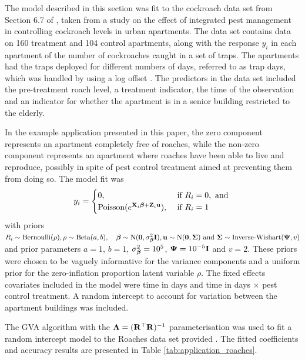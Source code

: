 The model described in this section was fit  to the cockroach data set from
Section 6.7 of \cite{Gelman2007}, taken from a study on the effect of
integrated pest management in controlling cockroach levels in urban apartments.
The data set contains data on 160 treatment and 104 control apartments, along
with the response $y_i$ in each apartment of the number of cockroaches caught
in a set of traps. The apartments had the traps deployed for different numbers
of days, referred to as trap days, which was handled by using a log offset
\citep{Agresti2002}. The predictors in the data set included the pre-treatment
roach level, a treatment indicator, the time of the observation and an
indicator for whether the apartment is in a senior building restricted to the
elderly.
		
In the example application presented in this paper, the zero component
represents an apartment completely free of roaches, while the non-zero
component represents an apartment where roaches have been able to live and
reproduce, possibly in spite of pest control treatment aimed at preventing them
from doing so. The model fit was
\begin{equation*}
    y_i = \begin{cases}
        0, &\text{ if } R_i = 0, \text{ and } \\
        \text{Poisson}(e^{{\bf X}_i {\boldsymbol \beta} + {\bf Z}_i {\bf u}}), & \text{ if } R_i = 1
	\end{cases}
\end{equation*}
with priors $R_i \sim \text{Bernoulli}(\rho), \rho \sim \text{Beta}(a, b),
\quad {\boldsymbol\beta} \sim \text{N}({\bf 0}, \sigma^2_{{\boldsymbol \beta}} {\bf I}), {\bf u} \sim
\text{N}({\bf 0}, {\boldsymbol \Sigma}) \text{ and } {\boldsymbol\Sigma} \sim
\text{Inverse-Wishart}({\boldsymbol \Psi}, v)$ and prior parameters $a = 1$, $b = 1$,
$\sigma^2_{\boldsymbol \beta} = 10^5$, ${\boldsymbol \Psi} = 10^{-5} {\bf I}$ and $v = 2$.  These priors were
chosen to be vaguely informative for the variance components and a uniform
prior for the zero-inflation proportion latent variable $\rho$. The fixed
effects covariates included in the model were time in days and time in days
$\times$ pest control treatment. A random intercept to account for variation
between the apartment buildings was included.
		
The GVA algorithm with the ${\boldsymbol \Lambda} = ({\bf R}^\top {\bf R})^{-1}$ parameterisation
was used to fit a random intercept model to the Roaches data set provided
\cite{Gelman2007}. The fitted coefficients and accuracy results are presented
in Table \ref{tab:application_roaches}.
		
		
